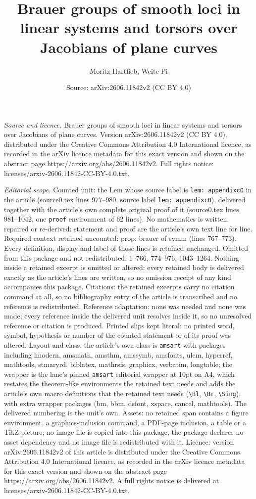 \documentclass[10pt,a4paper]{amsart}
\title[Brauer groups of smooth loci in linear systems and torsors o]{Brauer groups of smooth loci in linear systems and torsors over Jacobians of plane curves}
\author{Moritz Hartlieb, Weite Pi}
\date{Source: arXiv:2606.11842v2 (CC BY 4.0)}
\begin{document}
\maketitle

\noindent\emph{Source and licence.} Brauer groups of smooth loci in linear systems and torsors over Jacobians of plane curves. Version arXiv:2606.11842v2 (CC BY 4.0), distributed under the Creative Commons Attribution 4.0 International licence, as recorded in the arXiv licence metadata for this exact version and shown on the abstract page https://arxiv.org/abs/2606.11842v2. Full rights notice: licenses/arxiv-2606.11842-CC-BY-4.0.txt.\par\smallskip

\noindent\textit{Editorial scope.} Counted unit: the Lem whose source label is \texttt{lem: appendixc0} in the article (source0.tex lines 977--980, source label \texttt{lem: appendixc0}), delivered together with the article's own complete original proof of it (source0.tex lines 981--1042, one \texttt{proof} environment of 62 lines). No mathematics is written, repaired or re-derived: statement and proof are the article's own text line for line. Required context retained uncounted: prop: brauer of symm (lines 767--773). Every definition, display and label of those lines is retained unchanged. Omitted from this package and not redistributed: 1--766, 774--976, 1043--1264. Nothing inside a retained excerpt is omitted or altered: every retained body is delivered exactly as the article's lines are written, so no omission receipt of any kind accompanies this package. Citations: the retained excerpts carry no citation command at all, so no bibliography entry of the article is transcribed and no reference is redistributed. Reference adaptation: none was needed and none was made; every reference inside the delivered unit resolves inside it, so no unresolved reference or citation is produced. Printed slips kept literal: no printed word, symbol, hypothesis or number of the counted statement or of its proof was altered. Layout and class: the article's own class is \texttt{amsart} with packages including lmodern, amsmath, amsthm, amssymb, amsfonts, ulem, hyperref, mathtools, stmaryrd, biblatex, mathrsfs, graphicx, verbatim, longtable; the wrapper is the lane's pinned \texttt{amsart} editorial wrapper at 10pt on A4, which restates the theorem-like environments the retained text needs and adds the article's own macro definitions that the retained text needs (\texttt{\textbackslash Bl}, \texttt{\textbackslash Br}, \texttt{\textbackslash Sing}), with extra wrapper packages (bm, bbm, dsfont, xspace, cancel, mathtools). The delivered numbering is the unit's own. Assets: no retained span contains a figure environment, a graphics-inclusion command, a PDF-page inclusion, a table or a TikZ picture; no image file is copied into this package, the package declares no asset dependency and no image file is redistributed with it. Licence: version arXiv:2606.11842v2 of this article is distributed under the Creative Commons Attribution 4.0 International licence, as recorded in the arXiv licence metadata for this exact version and shown on the abstract page https://arxiv.org/abs/2606.11842v2. A full rights notice is delivered at licenses/arxiv-2606.11842-CC-BY-4.0.txt. 
\end{document}
